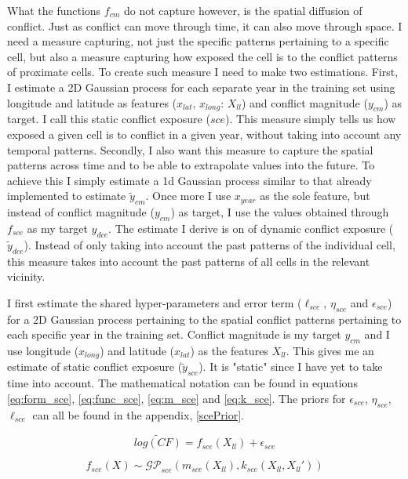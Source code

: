 \documentclass[a4paper]{article}
\begin{document}
What the functions $f_{cm}$ do not capture however, is the spatial diffusion of conflict. Just as conflict can move through time, it can also move through space. I need a measure capturing, not just the specific patterns pertaining to a specific cell, but also a measure capturing how exposed the cell is to the conflict patterns of proximate cells. To create such measure I need to make two estimations. First, I estimate a 2D Gaussian process for each separate year in the training set using longitude and latitude as features ($x_{lat}$, $x_{long}$: $X_{ll}$) and conflict magnitude  ($y_{cm}$) as target. I call this static conflict exposure ($sce$). This measure simply tells us how exposed a given cell is to conflict in a given year, without taking into account any temporal patterns. Secondly, I also want this measure to capture the spatial patterns across time and to be able to extrapolate values into the future. To achieve this I simply estimate a 1d Gaussian process similar to that already implemented to estimate $\tilde{y}_{cm}$. Once more I use $x_{year}$ as the sole feature, but instead of conflict magnitude ($y_{cm}$) as target, I use the values obtained through $f_{sce}$ as my target $y_{dce}$. The estimate I derive is on of dynamic conflict exposure ($\tilde{y}_{dce}$). Instead of only taking into account the past patterns of the individual cell, this measure takes into account the past patterns of all cells in the relevant vicinity.\par 

I first estimate the shared hyper-parameters and error term ($\ell_{sce}$, $\eta_{sce}$ and $\epsilon_{sce}$) for a 2D Gaussian process pertaining to the spatial conflict patterns pertaining to each specific year in the training set. Conflict magnitude is my target $y_{cm}$ and I use longitude ($x_{long}$) and latitude ($x_{lat}$) as the features $X_{ll}$. This gives me an estimate of static conflict exposure ($\tilde{y}_{sce}$). It is "static" since I have yet to take time into account. The mathematical notation can be found in equations \ref{eq:form_sce}, \ref{eq:func_sce}, \ref{eq:m_sce} and \ref{eq:k_sce}.  The priors for $\epsilon_{sce}$, $\eta_{sce}$, $\ell_{sce}$ can all be found in the appendix, \autoref{scePrior}.\par

\[
\widetilde{log(CF)} = f_{sce}(X_{ll}) + \epsilon_{sce} \tag{23} \label{eq:form_sce}
\]

\[
f_{sce}(X) \sim \mathcal{GP}_{sce}(m_{sce}(X_{ll}),k_{sce}(X_{ll},X_{ll}')) \tag{24} \label{eq:func_sce}
\]
\end{document}
